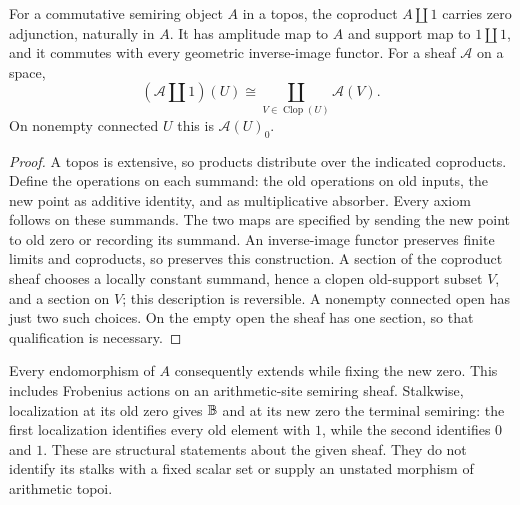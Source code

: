 \begin{proposition}\label{prop:internalzero}
For a commutative semiring object $A$ in a topos, the coproduct $A\amalg1$
carries zero adjunction, naturally in $A$. It has amplitude map to $A$ and
support map to $1\amalg1$, and it commutes with every geometric
inverse-image functor. For a sheaf $\mathcal A$ on a space,
\[
 (\mathcal A\amalg1)(U)
 \cong\coprod_{V\in\operatorname{Clop}(U)}\mathcal A(V).
\]
On nonempty connected $U$ this is $\mathcal A(U)_0$.
\end{proposition}
\begin{proof}
A topos is extensive, so products distribute over the indicated
coproducts. Define the operations on each summand: the old operations on
old inputs, the new point as additive identity, and as multiplicative
absorber. Every axiom follows on these summands. The two maps are
specified by sending the new point to old zero or recording its summand.
An inverse-image functor preserves finite limits and coproducts, so
preserves this construction. A section of the coproduct sheaf chooses a
locally constant summand, hence a clopen old-support subset $V$, and a
section on $V$; this description is reversible. A nonempty connected open
has just two such choices. On the empty open the sheaf has one section,
so that qualification is necessary.
\end{proof}

Every endomorphism of $A$ consequently extends while fixing the new zero.
This includes Frobenius actions on an arithmetic-site semiring sheaf.
Stalkwise, localization at its old zero gives $\mathbb B$ and at its new zero the
terminal semiring: the first localization identifies every old element
with $1$, while the second identifies $0$ and $1$. These are structural
statements about the given sheaf. They do not identify its stalks with a
fixed scalar set or supply an unstated morphism of arithmetic topoi.
